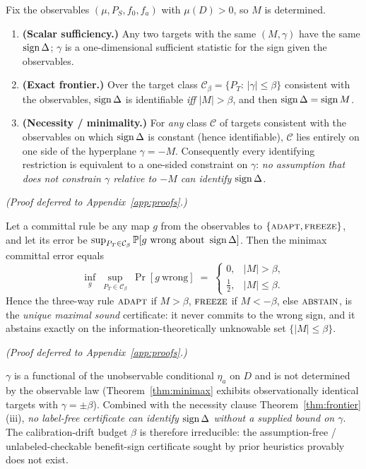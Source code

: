 \begin{theorem}\label{thm:frontier}
Fix the observables $(\mu,P_S,f_0,f_a)$ with $\mu(D)>0$, so $M$ is determined.
\begin{enumerate}\itemsep1pt
\item[\textnormal{(i)}] \textbf{(Scalar sufficiency.)} Any two targets with the same
$(M,\gamma)$ have the same $\operatorname{sign}\Delta$; $\gamma$ is a one-dimensional sufficient statistic
for the sign given the observables.
\item[\textnormal{(ii)}] \textbf{(Exact frontier.)} Over the target class
$\mathcal C_\beta=\{P_T:\,|\gamma|\le\beta\}$ consistent with the observables, $\operatorname{sign}\Delta$
is identifiable \emph{iff} $|M|>\beta$, and then $\operatorname{sign}\Delta=\operatorname{sign} M$.
\item[\textnormal{(iii)}] \textbf{(Necessity / minimality.)} For \emph{any} class
$\mathcal C$ of targets consistent with the observables on which $\operatorname{sign}\Delta$ is constant
(hence identifiable), $\mathcal C$ lies entirely on one side of the hyperplane
$\gamma=-M$. Consequently every identifying restriction is equivalent to a one-sided
constraint on $\gamma$: \emph{no assumption that does not constrain $\gamma$ relative to
$-M$ can identify $\operatorname{sign}\Delta$.}
\end{enumerate}
\end{theorem}
\emph{(Proof deferred to Appendix~\ref{app:proofs}.)}

\begin{theorem}\label{thm:minimax}
Let a committal rule be any map $g$ from the observables to $\{\textsc{adapt},\textsc{freeze}\}$,
and let its error be $\sup_{P_T\in\mathcal C_\beta}\mathbb{P}[g\ \text{wrong about }\operatorname{sign}\Delta]$.
Then the minimax committal error equals
\[
  \inf_g\ \sup_{P_T\in\mathcal C_\beta}\ \Pr[g\ \text{wrong}]
  \;=\;
  \begin{cases} 0,& |M|>\beta,\\[2pt] \tfrac12,& |M|\le\beta.\end{cases}
\]
Hence the three-way rule
$\textsc{adapt}$ if $M>\beta$, $\textsc{freeze}$ if $M<-\beta$, else $\textsc{abstain}$,
is the \emph{unique maximal sound} certificate: it never commits to the wrong sign, and it
abstains exactly on the information-theoretically unknowable set $\{|M|\le\beta\}$.
\end{theorem}
\emph{(Proof deferred to Appendix~\ref{app:proofs}.)}

\begin{corollary}\label{cor:irreducible}
$\gamma$ is a functional of the unobservable conditional $\eta_a$ on $D$ and is not
determined by the observable law (Theorem~\ref{thm:minimax} exhibits observationally
identical targets with $\gamma=\pm\beta$). Combined with the necessity clause
Theorem~\ref{thm:frontier}(iii), \emph{no label-free certificate can identify $\operatorname{sign}\Delta$
without a supplied bound on $\gamma$}. The calibration-drift budget $\beta$ is therefore
irreducible: the assumption-free / unlabeled-checkable benefit-sign certificate sought by
prior heuristics provably does not exist.
\end{corollary}

